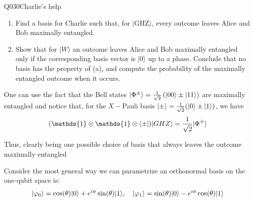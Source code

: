 \begin{entry}{Q030}{Charlie's help}
\begin{problem}
\begin{enumerate}
  \item[(a)] Find a basis for Charlie such that, for $|\mathrm{GHZ}\rangle$,
  every outcome leaves Alice and Bob maximally entangled.

  \item[(b)] Show that for $|W\rangle$ an outcome leaves Alice and Bob
  maximally entangled only if the corresponding basis vector is $|0\rangle$
  up to a phase. Conclude that no basis has the property of (a), and compute
  the probability of the maximally entangled outcome when it occurs.
\end{enumerate}
\end{problem}

\begin{solution}[a)]
One can use the fact that the Bell states $\lvert \Phi^{\pm } \rangle = \frac{1}{\sqrt{2}} \left(\lvert 00 \rangle \pm \lvert 11 \rangle\right)$ are maximally entangled and notice that, for the $X-$Pauli basis $\lvert \pm \rangle = \frac{1}{\sqrt{2}} (\lvert 0 \rangle\pm \lvert 1 \rangle)$, we have 
\begin{equation}
    (\mathds{1}\otimes\mathds{1}\otimes\bra{\pm}) \ket{GHZ} = \frac{1}{\sqrt{2}} \ket{\Phi^{\pm}}
\end{equation}

Thus, clearly being one possible choice of basis that always leaves the outcome maximally entangled

\end{solution}

\begin{solution}[b)]
Consider the most general way we can parametrize an orthonormal basis on the one-qubit space is: 
\begin{equation}
    \lvert \varphi_0 \rangle = \cos(\theta) \lvert 0 \rangle +e^{i\phi} \sin(\theta) \lvert 1 \rangle, \quad  \lvert \varphi_1 \rangle = \sin(\theta) \lvert 0 \rangle - e^{i\phi} \cos(\theta) \lvert 1 \rangle
\end{equation}


\end{solution}
\end{entry}
